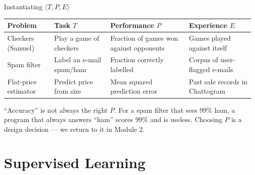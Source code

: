 \documentclass[aspectratio=169,10pt]{beamer}
\begin{document}
\begin{frame}{Instantiating $\langle T, P, E\rangle$}
  \small
  \begin{center}
  \renewcommand{\arraystretch}{1.35}
  \begin{tabular}{@{}L{2.7cm}L{3.0cm}L{3.2cm}L{3.2cm}@{}}
    \toprule
    \textbf{Problem} & \textbf{Task $T$} & \textbf{Performance $P$} & \textbf{Experience $E$}\\
    \midrule
    Checkers (Samuel) & Play a game of checkers & Fraction of games won against opponents & Games played against itself\\
    Spam filter & Label an e-mail spam/ham & Fraction correctly labelled & Corpus of user-flagged e-mails\\
    Flat-price estimator & Predict price from size & Mean squared prediction error & Past sale records in Chattogram\\
    \bottomrule
  \end{tabular}
  \end{center}
  \vspace{2mm}
  \begin{pitfall}
    ``Accuracy'' is not always the right $P$. For a spam filter that sees
    $99\%$ ham, a program that always answers ``ham'' scores $99\%$ and is
    useless. Choosing $P$ is a design decision --- we return to it in Module 2.
  \end{pitfall}
\end{frame}

\section{Supervised Learning}
\end{document}

